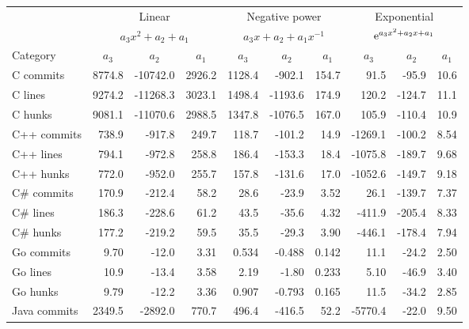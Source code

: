 \documentclass[pdflatex, sn-mathphys, referee]{sn-jnl}%
\theoremstyle{thmstyleone}%
\theoremstyle{thmstyletwo}%
\theoremstyle{thmstylethree}%
\def\tablelinesep{}
\newcommand{\esup}[1]{{\rm e}^{#1}}
\theoremstyle{thmstyleone}
\begin{document}
\begin{table}
\begin{center}
\begin{minipage}{0.83\textwidth}
\begin{tabular*}{\textwidth}{l r r r r r r r r r }
\toprule%
  & \multicolumn{3}{c}{Linear} & \multicolumn{3}{c}{Negative power} & \multicolumn{3}{c}{Exponential} \\
  & \multicolumn{3}{c}{$a_3 x^2 + a_2 + a_1$} & \multicolumn{3}{c}{$a_3 x + a_2 + a_1 x^{-1}$} & \multicolumn{3}{c}{$\esup{a_3 x^2 + a_2 x + a_1}$} \\
Category & \multicolumn{1}{c}{$a_3$} & \multicolumn{1}{c}{$a_2$} & \multicolumn{1}{c}{$a_1$} & \multicolumn{1}{c}{$a_3$} & \multicolumn{1}{c}{$a_2$} & \multicolumn{1}{c}{$a_1$} & \multicolumn{1}{c}{$a_3$} & \multicolumn{1}{c}{$a_2$} & \multicolumn{1}{c}{$a_1$} \\
\midrule
C commits & 8774.8 & -10742.0 & 2926.2 & 1128.4 & -902.1 & 154.7 & 91.5 & -95.9 & 10.6 \\
C lines & 9274.2 & -11268.3 & 3023.1 & 1498.4 & -1193.6 & 174.9 & 120.2 & -124.7 & 11.1 \\
C hunks & 9081.1 & -11070.6 & 2988.5 & 1347.8 & -1076.5 & 167.0 & 105.9 & -110.4 & 10.9 \\ \tablelinesep
C++ commits & 738.9 & -917.8 & 249.7 & 118.7 & -101.2 & 14.9 & -1269.1 & -100.2 & 8.54 \\
C++ lines & 794.1 & -972.8 & 258.8 & 186.4 & -153.3 & 18.4 & -1075.8 & -189.7 & 9.68 \\
C++ hunks & 772.0 & -952.0 & 255.7 & 157.8 & -131.6 & 17.0 & -1052.6 & -149.7 & 9.18 \\ \tablelinesep
C\# commits & 170.9 & -212.4 & 58.2 & 28.6 & -23.9 & 3.52 & 26.1 & -139.7 & 7.37 \\
C\# lines & 186.3 & -228.6 & 61.2 & 43.5 & -35.6 & 4.32 & -411.9 & -205.4 & 8.33 \\
C\# hunks & 177.2 & -219.2 & 59.5 & 35.5 & -29.3 & 3.90 & -446.1 & -178.4 & 7.94 \\ \tablelinesep
Go commits & 9.70 & -12.0 & 3.31 & 0.534 & -0.488 & 0.142 & 11.1 & -24.2 & 2.50 \\
Go lines & 10.9 & -13.4 & 3.58 & 2.19 & -1.80 & 0.233 & 5.10 & -46.9 & 3.40 \\
Go hunks & 9.79 & -12.2 & 3.36 & 0.907 & -0.793 & 0.165 & 11.5 & -34.2 & 2.85 \\ \tablelinesep
Java commits & 2349.5 & -2892.0 & 770.7 & 496.4 & -416.5 & 52.2 & -5770.4 & -22.0 & 9.50 \\

\end{tabular*}
\end{minipage}
\end{center}
\end{table}
\end{document}
